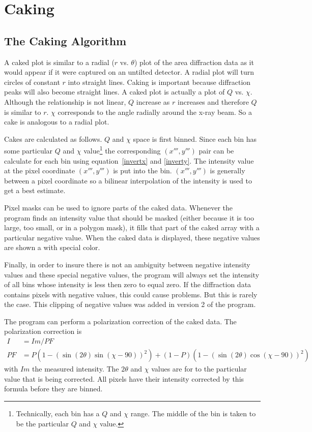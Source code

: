 \chapter{Caking}\label{Caking}

\section{The Caking Algorithm}

A caked plot is similar to a radial ($r$ vs. $\theta$) plot 
of the area diffraction data as it would appear if it were
captured on an untilted detector. A radial plot will turn
circles of constant $r$ into straight lines.
Caking is important because diffraction peaks will 
also become straight lines. A caked plot is actually a 
plot of $Q$ vs. $\chi$. 
Although the relationship is not linear, $Q$ increase as $r$ 
increases and therefore $Q$ is similar to $r$.
$\chi$ corresponds to the angle radially around the x-ray
beam. So a cake is analogous to a radial 
plot.

Cakes are calculated as follows.
$Q$ and $\chi$ space is first binned. Since each bin has 
some particular $Q$ and $\chi$ value\footnote{Technically,
each bin has a $Q$ and $\chi$ range. The middle of the bin 
is taken to be the particular $Q$ and $\chi$ value.} 
the corresponding $(x''',y''')$ pair can be calculate for each
bin using equation~\ref{invertx} and \ref{inverty}. The
intensity value at the pixel coordinate $(x''',y''')$
is put into the bin.
$(x''',y''')$ is generally between a pixel coordinate so
a bilinear interpolation of the intensity is used to
get a best estimate.

Pixel masks can be used to ignore parts of the caked data.
Whenever the program finds an intensity value
that should be masked (either because it is too 
large, too small, or in a polygon mask), it fills
that part of the caked array with a particular 
negative value. When the caked data is displayed,
these negative values are shown a with special color.

Finally, in order to insure there is not an ambiguity between
negative intensity values and these special negative values, the 
program will always set the intensity of all bins whose intensity is 
less then zero to equal zero. If the diffraction data contains pixels 
with negative values, this could cause problems. But this is rarely
the case. This clipping of negative values was added in version 2
of the program.

The program can perform a polarization correction of
the caked data. The polarization 
correction is
\begin{align}
    I&=Im/PF \\ 
    PF&=P(1 - (\sin(2\theta)\sin(\chi-90))^2) + 
    (1 - P)(1 - (\sin(2\theta)\cos(\chi-90))^2)
\end{align}
with $Im$ the measured intensity. The $2\theta$ and $\chi$
values are for to the particular value that is being 
corrected. All pixels have their 
intensity corrected by this formula before they
are binned.

